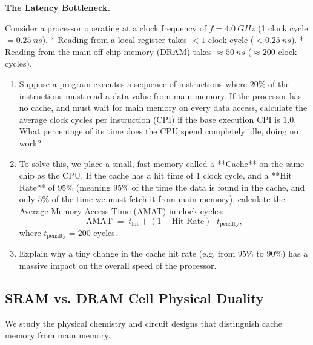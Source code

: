 \documentclass[12pt, a4paper]{book}
\begin{document}
\begin{puzzlebox}
\textbf{The Latency Bottleneck.}

Consider a processor operating at a clock frequency of $f = \SI{4.0}{GHz}$ (1 clock cycle $= \SI{0.25}{ns}$).
* Reading from a local register takes $< 1$ clock cycle ($< \SI{0.25}{ns}$).
* Reading from the main off-chip memory (DRAM) takes $\approx \SI{50}{ns}$ ($\approx 200$ clock cycles).
\begin{enumerate}[label=(\alph*), leftmargin=*]
  \item Suppose a program executes a sequence of instructions where $20\%$ of the instructions must read a data value from main memory.
        If the processor has no cache, and must wait for main memory on every data access, calculate the average clock cycles per instruction (CPI) if the base execution CPI is 1.0.
        What percentage of its time does the CPU spend completely idle, doing no work?
  \item To solve this, we place a small, fast memory called a **Cache** on the same chip as the CPU.
        If the cache has a hit time of 1 clock cycle, and a **Hit Rate** of $95\%$ (meaning $95\%$ of the time the data is found in the cache, and only $5\%$ of the time we must fetch it from main memory), calculate the Average Memory Access Time (AMAT) in clock cycles:
        \[
          \text{AMAT} \;=\; t_{\text{hit}} + (1 - \text{Hit Rate}) \cdot t_{\text{penalty}},
        \]
        where $t_{\text{penalty}} = 200$ cycles.
  \item Explain why a tiny change in the cache hit rate (e.g. from $95\%$ to $90\%$) has a massive impact on the overall speed of the processor.
\end{enumerate}
\end{puzzlebox}

\subsection{SRAM vs. DRAM Cell Physical Duality}

We study the physical chemistry and circuit designs that distinguish cache memory from main memory.
\end{document}
